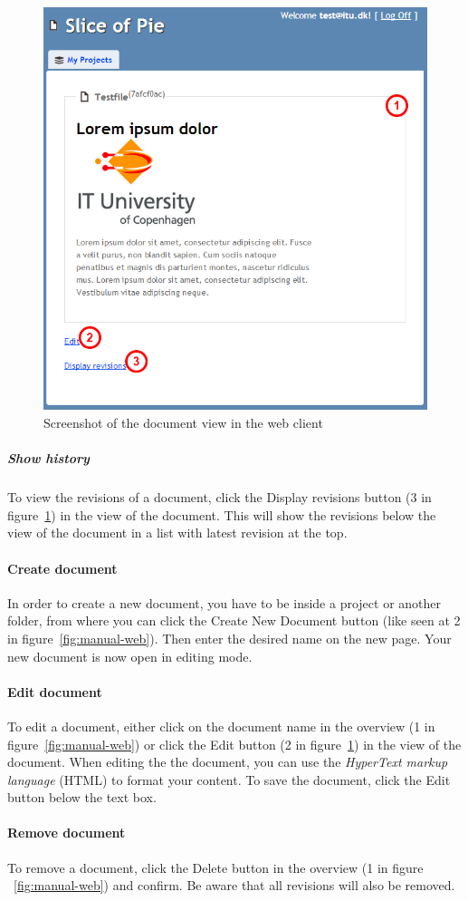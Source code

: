	\begin{figure}[htb]
		\centering
		\includegraphics[width=1\textwidth]{User_manual/graphics/web-document.png}
		\caption{Screenshot of the document view in the web client}
		\label{fig:manual-web-document}
	\end{figure}
		
		\subparagraph{Show history}
		To view the revisions of a document, click the Display revisions button (3 in figure~\ref{fig:manual-web-document}) in the view of the document. This will show the revisions below the view of the document in a list with latest revision at the top.

	\paragraph{Create document}
	In order to create a new document, you have to be inside a project or another folder, from where you can click the Create New Document button (like seen at 2 in figure~\ref{fig:manual-web}). Then enter the desired name on the new page. Your new document is now open in editing mode.
	
	\paragraph{Edit document}
	To edit a document, either click on the document name in the overview (1 in figure~\ref{fig:manual-web}) or click the Edit button (2 in figure~\ref{fig:manual-web-document}) in the view of the document. When editing the the document, you can use the \emph{HyperText markup language}\cite{w3cHTML} (HTML) to format your content. To save the document, click the Edit button below the text box.
	
	\paragraph{Remove document}
	To remove a document, click the Delete button in the overview (1 in figure ~\ref{fig:manual-web}) and confirm. Be aware that all revisions will also be removed.